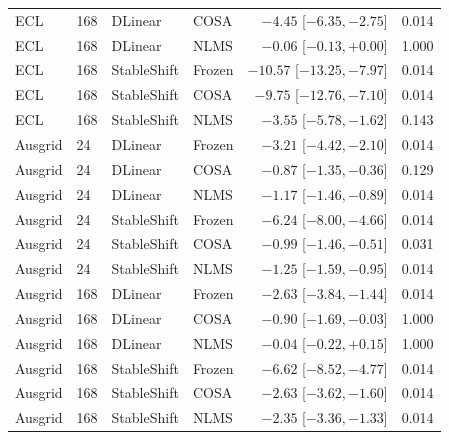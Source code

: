 \begin{longtable}{lllp{}rp{}}
ECL & 168 & DLinear & COSA & $-4.45$ [$ -6.35, -2.75 $] & 0.014\\
ECL & 168 & DLinear & NLMS & $-0.06$ [$ -0.13, +0.00 $] & 1.000\\
ECL & 168 & StableShift & Frozen & $-10.57$ [$ -13.25, -7.97 $] & 0.014\\
ECL & 168 & StableShift & COSA & $-9.75$ [$ -12.76, -7.10 $] & 0.014\\
ECL & 168 & StableShift & NLMS & $-3.55$ [$ -5.78, -1.62 $] & 0.143\\
Ausgrid & 24 & DLinear & Frozen & $-3.21$ [$ -4.42, -2.10 $] & 0.014\\
Ausgrid & 24 & DLinear & COSA & $-0.87$ [$ -1.35, -0.36 $] & 0.129\\
Ausgrid & 24 & DLinear & NLMS & $-1.17$ [$ -1.46, -0.89 $] & 0.014\\
Ausgrid & 24 & StableShift & Frozen & $-6.24$ [$ -8.00, -4.66 $] & 0.014\\
Ausgrid & 24 & StableShift & COSA & $-0.99$ [$ -1.46, -0.51 $] & 0.031\\
Ausgrid & 24 & StableShift & NLMS & $-1.25$ [$ -1.59, -0.95 $] & 0.014\\
Ausgrid & 168 & DLinear & Frozen & $-2.63$ [$ -3.84, -1.44 $] & 0.014\\
Ausgrid & 168 & DLinear & COSA & $-0.90$ [$ -1.69, -0.03 $] & 1.000\\
Ausgrid & 168 & DLinear & NLMS & $-0.04$ [$ -0.22, +0.15 $] & 1.000\\
Ausgrid & 168 & StableShift & Frozen & $-6.62$ [$ -8.52, -4.77 $] & 0.014\\
Ausgrid & 168 & StableShift & COSA & $-2.63$ [$ -3.62, -1.60 $] & 0.014\\
Ausgrid & 168 & StableShift & NLMS & $-2.35$ [$ -3.36, -1.33 $] & 0.014\\
\bottomrule
\end{longtable}
